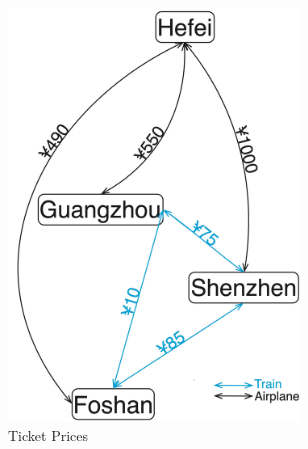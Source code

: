 \documentclass{article}
\begin{document}
\begin{figure}[!ht]
  \centering
  \begin{subfigure}{0.3\textwidth}
    \includegraphics[width=0.85\textwidth]{pic/toy_all.jpg}
    \caption{Ticket Prices}%
    \label{fig:Ticketprice}
  \end{subfigure}
  \hfill %
  \begin{subfigure}{0.3\textwidth}

\end{subfigure}
\end{figure}
\end{document}

